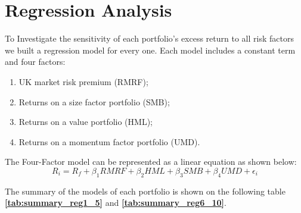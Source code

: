 \documentclass[11pt]{article}
\begin{document}
\section{Regression Analysis}
To Investigate the sensitivity of each portfolio’s excess return to all risk factors we built a regression model for every one. Each model includes a constant 
term and four factors:
\begin{enumerate}
    \item UK market risk premium (RMRF);
    \item Returns on a size factor portfolio (SMB);
    \item Returns on a value portfolio (HML);
    \item Returns on a momentum factor portfolio (UMD).
\end{enumerate}

The Four-Factor model can be represented as a linear equation as shown below:
\begin{equation}
    R_i = R_f + \beta_1RMRF + \beta_2HML + \beta_3SMB + \beta_4UMD + \epsilon_i
    \label{eq: ffc_eq} 
\end{equation}

The summary of the models of each portfolio is shown on the following table \textbf{\ref{tab:summary_reg1_5}} and \textbf{\ref{tab:summary_reg6_10}}.
\end{document}
